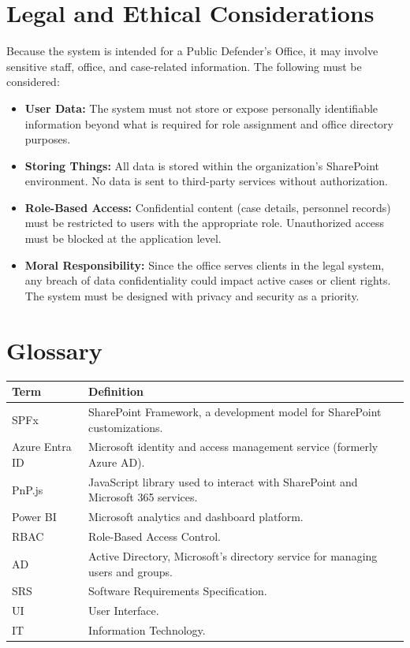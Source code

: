 \documentclass[12pt]{article}
\begin{document}
\section{Legal and Ethical Considerations}
Because the system is intended for a Public Defender's Office, it may involve sensitive staff, office, and case-related information. The following must be considered:
\begin{itemize}
  \item \textbf{User Data:} The system must not store or expose personally identifiable information beyond what is required for role assignment and office directory purposes.
  \item \textbf{Storing Things:} All data is stored within the organization's SharePoint environment. No data is sent to third-party services without authorization.
  \item \textbf{Role-Based Access:} Confidential content (case details, personnel records) must be restricted to users with the appropriate role. Unauthorized access must be blocked at the application level.
  \item \textbf{Moral Responsibility:} Since the office serves clients in the legal system, any breach of data confidentiality could impact active cases or client rights. The system must be designed with privacy and security as a priority.
\end{itemize}

\section{Glossary}
\begin{longtable}{|p{1.4in}|p{4.6in}|}
\hline
\textbf{Term} & \textbf{Definition} \\ \hline
SPFx & SharePoint Framework, a development model for SharePoint customizations. \\ \hline
Azure Entra ID & Microsoft identity and access management service (formerly Azure AD). \\ \hline
PnP.js & JavaScript library used to interact with SharePoint and Microsoft 365 services. \\ \hline
Power BI & Microsoft analytics and dashboard platform. \\ \hline
RBAC & Role-Based Access Control. \\ \hline
AD & Active Directory, Microsoft's directory service for managing users and groups. \\ \hline
SRS & Software Requirements Specification. \\ \hline
UI & User Interface. \\ \hline
IT & Information Technology. \\ \hline
\end{longtable}
\end{document}
